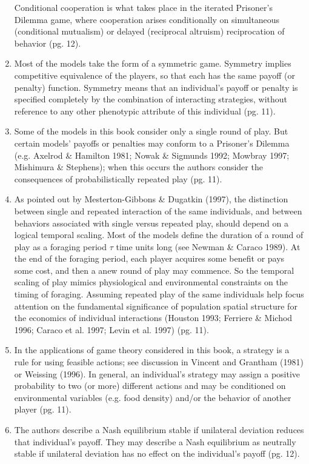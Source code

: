 \documentclass[a4paper,11pt]{article}
\begin{document}
\begin{enumerate}
Conditional cooperation is what takes place in the iterated Prisoner's Dilemma game, where cooperation arises conditionally on simultaneous (conditional mutualism) or delayed (reciprocal altruism) reciprocation of behavior (pg. 12). 
\item Most of the models take the form of a symmetric game. Symmetry implies competitive equivalence of the players, so that each has the same payoff (or penalty) function. Symmetry means that an individual's payoff or penalty is specified completely by the combination of interacting strategies, without reference to any other phenotypic attribute of this individual (pg. 11). 
\item Some of the models in this book consider only a single round of play. But certain models' payoffs or penalties may conform to a Prisoner's Dilemma (e.g. Axelrod \& Hamilton 1981; Nowak \& Sigmunds 1992; Mowbray 1997; Mishimura \& Stephens); when this occurs the authors consider the consequences of probabilistically repeated play (pg. 11). 
\item As pointed out by Mesterton-Gibbons \& Dugatkin (1997), the distinction between single and repeated interaction of the same individuals, and between behaviors associated with single versus repeated play, should depend on a logical temporal scaling. Most of the models define the duration of a round of play as a foraging period $\tau$ time units long (see Newman \& Caraco 1989). At the end of the foraging period, each player acquires some benefit or pays some cost, and then a anew round of play may commence. So the temporal scaling of play mimics physiological and environmental constraints on the timing of foraging. Assuming repeated play of the same individuals help focus attention on the fundamental significance of population spatial structure for the economics of individual interactions (Houston 1993; Ferriere \& Michod 1996; Caraco et al. 1997; Levin et al. 1997) (pg. 11).  
\item In the applications of game theory considered in this book, a strategy is a rule for using feasible actions; see discussion in Vincent and Grantham (1981) or Weissing (1996). In general, an individual's strategy may assign a positive probability to two (or more) different actions and may be conditioned on environmental variables (e.g. food density) and/or the behavior of another player (pg. 11). 
\item The authors describe a Nash equilibrium stable if unilateral deviation reduces that individual's payoff. They may describe a Nash equilibrium as neutrally stable if unilateral deviation has no effect on the individual's payoff (pg. 12). 

\end{enumerate}
\end{document}
